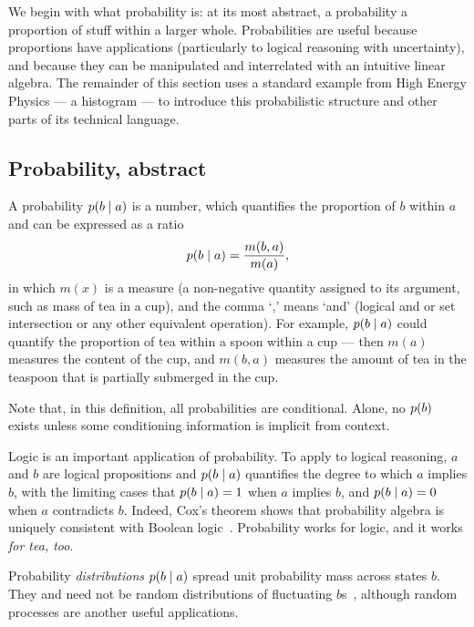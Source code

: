 We begin with what probability is: at its most abstract, a probability a
proportion of stuff within a larger whole.
Probabilities are useful because proportions have applications
(particularly to logical reasoning with uncertainty), and because
they can be manipulated and interrelated with an intuitive linear algebra.
The remainder of this section uses a standard example from High Energy Physics
--- a histogram ---
to introduce this probabilistic structure and other parts of its technical
language.


\subsection{Probability, abstract}
A probability $p(b \mid a)$ is a number, which quantifies the proportion
of $b$ within $a$ and can be expressed as a ratio~\cite{axioms1010038}
\begin{equation}
\label{eqn:searches_prob_ratio}
p(b \mid a) = \frac{m(b, a)}{m(a)},
\end{equation}
in which $m(x)$ is a measure (a non-negative quantity assigned to its
argument, such as mass of tea in a cup), and the comma `,' means `and'
(logical and or set intersection or any other equivalent operation).
For example, $p(b \mid a)$ could quantify the proportion of tea within
a spoon within a cup --- then $m(a)$ measures the content of the cup, and
$m(b, a)$ measures the amount of tea in the teaspoon that is partially
submerged in the cup.

Note that, in this definition, all probabilities are conditional.
Alone, no $p(b)$ exists unless some conditioning information is implicit
from context.

Logic is an important application of probability.
To apply to logical reasoning, $a$ and $b$ are logical propositions and
$p(b \mid a)$ quantifies the degree to which $a$ implies $b$, with the
limiting cases that $p(b \mid a) = 1$ when $a$ implies $b$,
and $p(b \mid a) = 0$ when $a$ contradicts $b$.
Indeed, Cox's theorem shows that probability algebra is uniquely consistent
with Boolean logic~\cite{
cox1946probability,
cox1961algebra,
garrett1998nand,
jaynes2003probability,
keynes1920treatise
}.
Probability works for logic, and it works \emph{for tea, too}.

Probability \emph{distributions} $p(b \mid a)$ spread unit probability mass
across states $b$.
They and need not be random distributions of fluctuating $b$s~\cite{
jaynes2003probability,
frankfurt2005on
},
although random processes are another useful applications.

